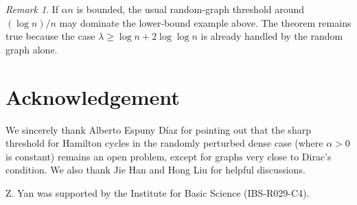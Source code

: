 \documentclass[11pt,reqno]{amsart}
\theoremstyle{definition}
\theoremstyle{remark}
\newtheorem{remark}[theorem]{Remark}
\renewcommand\ge{\geqslant}
\begin{document}
\begin{remark}
If $\alpha n$ is bounded, the usual random-graph threshold around $(\log n)/n$ may dominate the lower-bound example above. The theorem remains true because the case $\lambda\ge \log n+2\log\log n$ is already handled by the random graph alone.
\end{remark}

\medskip

\section*{Acknowledgement}

We sincerely thank Alberto Espuny D\'iaz for pointing out that the sharp threshold for Hamilton cycles in the randomly perturbed dense case (where $\alpha > 0$ is constant) remains an open problem, except for graphs very close to Dirac's condition. We also thank Jie Han and Hong Liu for helpful discussions. 

Z. Yan was supported by the Institute for Basic Science (IBS-R029-C4).


\medskip
\end{document}
